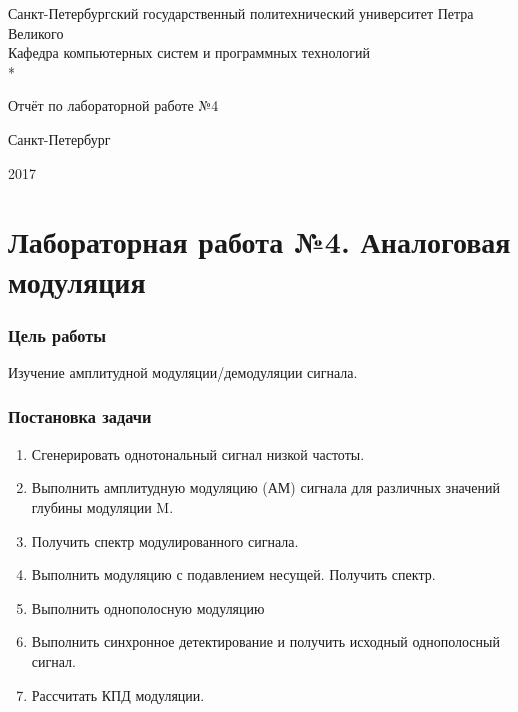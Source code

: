 \documentclass[a4paper,14pt]{article}
\begin{document}

\begin{titlepage}
	\newpage
	
	\begin{center}
		Санкт-Петербургский государственный политехнический 
		университет Петра Великого \\
		\vspace{1cm}
		Кафедра компьютерных систем и программных технологий\\*
	\end{center}
	
	\vspace{8em}
	
	\begin{center}
		 Отчёт по лабораторной работе №4
	\end{center}
	
	\vspace{2.5em}

	\vspace{6em}

	\vspace{\fill}
	
	\begin{center}
		Санкт-Петербург
		
		 2017
	\end{center}
	
\end{titlepage}

\tableofcontents

\newpage

\part*{Лабораторная работа №4. Аналоговая модуляция}
\setcounter {section}{0}
\setcounter {equation}{0}
\setcounter {figure}{0}
\section{Цель работы}
\hspace{0,5cm}  Изучение амплитудной модуляции/демодуляции сигнала.
\section{Постановка задачи}
\begin{enumerate}
\item Сгенерировать однотональный сигнал низкой частоты.
\item Выполнить амплитудную модуляцию (АМ) сигнала для различных значений глубины модуляции M.
\item Получить спектр модулированного сигнала.
\item Выполнить модуляцию с подавлением несущей. Получить спектр.
\item Выполнить однополосную модуляцию
\item Выполнить синхронное детектирование и получить исходный однополосный сигнал.
\item Рассчитать КПД модуляции.
\end{enumerate}
\end{document}
